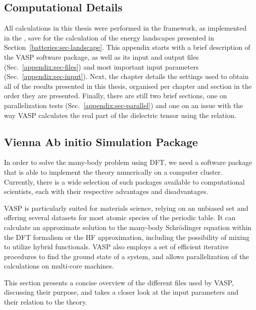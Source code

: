 \begin{refsection} 

\chapter{Computational Details} \label{appendix:sec-computational} 
 
All calculations in this thesis were performed in the  framework, 
as implemented in the , save for the calculation of the energy 
landscapes presented in Section~\ref{batteries:sec-landscape}. This appendix starts with 
a brief description of the \gls{VASP} software package, as well as its input and 
output files (Sec.~\ref{appendix:sec-files}) and most important input 
parameters (Sec.~\ref{appendix:sec-input}). Next, the chapter details the 
settings used to obtain all of the results presented in this thesis, organised 
per chapter and section in the order they are presented. Finally, there are 
still two brief sections, one on parallelization tests 
(Sec.~\ref{appendix:sec-parallel}) and one on an issue with the way 
\gls{VASP} calculates the real part of the dielectric tensor using 
the  relation.

\section{Vienna Ab initio Simulation Package} \label{appendix:sec-VASP} 
 
In order to solve the many-body problem using \gls{DFT}, we need a software package 
that is able to implement the theory numerically on a computer cluster. 
Currently, there is a wide selection of such packages available to 
computational scientists, each with their respective advantages and 
disadvantages. 
 
\gls{VASP} is particularly suited for materials science, relying on an unbiased
 set and offering several  datasets for 
most atomic species of the periodic table. It can calculate an approximate 
solution to the many-body Schr\"odinger equation within the \gls{DFT} formalism or 
the \gls{HF} approximation, including the possibility of mixing to utilize hybrid 
functionals. \gls{VASP} also employs a set of efficient iterative procedures to find 
the ground state of a system, and allows parallelization of the calculations 
on multi-core machines. 
 
This section presents a concise overview of the different files used by 
VASP, discussing their purpose, and takes a closer look at the 
input parameters and their relation to the theory. 
 

\end{refsection}
